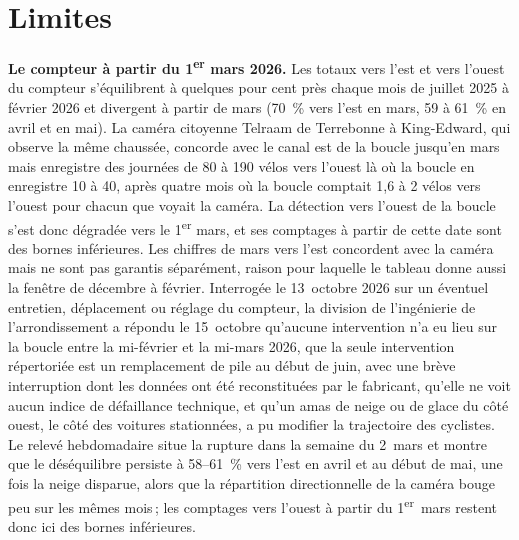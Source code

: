 \documentclass[11pt,letterpaper]{article}
\begin{document}
\section{Limites}

\textbf{Le compteur à partir du 1\textsuperscript{er} mars 2026.} Les
totaux vers l'est et vers l'ouest du compteur s'équilibrent à quelques
pour cent près chaque mois de juillet 2025 à février 2026 et divergent à
partir de mars (70~\% vers l'est en mars, 59 à 61~\% en avril et en mai).
La caméra citoyenne Telraam de Terrebonne à King-Edward, qui observe la
même chaussée, concorde avec le canal est de la boucle jusqu'en mars mais
enregistre des journées de 80 à 190 vélos vers l'ouest là où la boucle en
enregistre 10 à 40, après quatre mois où la boucle comptait 1,6 à 2 vélos
vers l'ouest pour chacun que voyait la caméra. La détection vers l'ouest
de la boucle s'est donc dégradée vers le 1\textsuperscript{er} mars, et
ses comptages à partir de cette date sont des bornes inférieures. Les
chiffres de mars vers l'est concordent avec la caméra mais ne sont pas
garantis séparément, raison pour laquelle le tableau donne aussi la
fenêtre de décembre à février. Interrogée le 13~octobre 2026 sur un
éventuel entretien, déplacement ou réglage du compteur, la division de
l'ingénierie de l'arrondissement a répondu le 15~octobre qu'aucune
intervention n'a eu lieu sur la boucle entre la mi-février et la mi-mars
2026, que la seule intervention répertoriée est un remplacement de pile au
début de juin, avec une brève interruption dont les données ont été
reconstituées par le fabricant, qu'elle ne voit aucun indice de
défaillance technique, et qu'un amas de neige ou de glace du côté ouest,
le côté des voitures stationnées, a pu modifier la trajectoire des
cyclistes. Le relevé hebdomadaire situe la rupture dans la semaine du
2~mars et montre que le déséquilibre persiste à 58--61~\% vers l'est en
avril et au début de mai, une fois la neige disparue, alors que la
répartition directionnelle de la caméra bouge peu sur les mêmes mois\,;
les comptages vers l'ouest à partir du 1\textsuperscript{er}~mars restent
donc ici des bornes inférieures.
\end{document}
